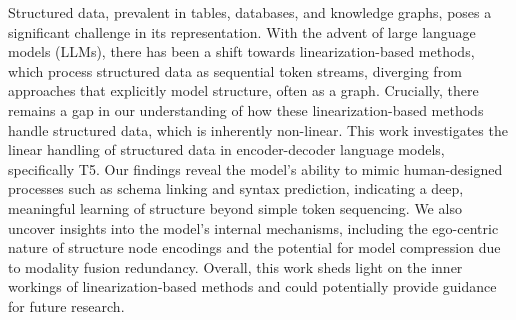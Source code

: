 Structured data, prevalent in tables, databases, and knowledge graphs, poses a significant challenge in its representation. With the advent of large language models (LLMs), there has been a shift towards linearization-based methods, which process structured data as sequential token streams, diverging from approaches that explicitly model structure, often as a graph. Crucially, there remains a gap in our understanding of how these linearization-based methods handle structured data, which is inherently non-linear. This work investigates the linear handling of structured data in encoder-decoder language models, specifically T5. Our findings reveal the model's ability to mimic human-designed processes such as schema linking and syntax prediction, indicating a deep, meaningful learning of structure beyond simple token sequencing. We also uncover insights into the model's internal mechanisms, including the ego-centric nature of structure node encodings and the potential for model compression due to modality fusion redundancy. Overall, this work sheds light on the inner workings of linearization-based methods and could potentially provide guidance for future research.